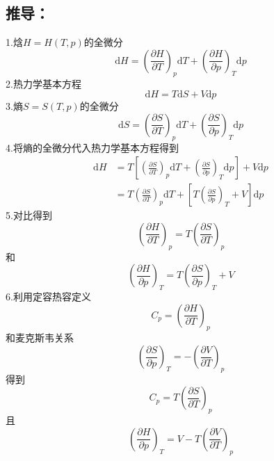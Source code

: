 \newpage
\subsection{推导：}
1.焓$H=H(T,p)$的全微分
\begin{equation}
    \mathrm{d}H=\left( \frac{\partial H}{\partial T} \right) _p\mathrm{d}T+\left( \frac{\partial H}{\partial p} \right) _T\mathrm{d}p
\end{equation}
2.热力学基本方程
\begin{equation}
    \mathrm{d}H=T\mathrm{d}S+V\mathrm{d}p
\end{equation}
3.熵$S=S(T,p)$的全微分
\begin{equation}
    \mathrm{d}S=\left( \frac{\partial S}{\partial T} \right) _p\mathrm{d}T+\left( \frac{\partial S}{\partial p} \right) _T\mathrm{d}p
\end{equation}
4.将熵的全微分代入热力学基本方程得到
\begin{equation}
    \begin{aligned}
        \mathrm{d}H&=T\left[ \left( \frac{\partial S}{\partial T} \right) _p\mathrm{d}T+\left( \frac{\partial S}{\partial p} \right) _T\mathrm{d}p \right] +V\mathrm{d}p
\\
&=T\left( \frac{\partial S}{\partial T} \right) _p\mathrm{d}T+\left[ T\left( \frac{\partial S}{\partial p} \right) _T+V \right] \mathrm{d}p
    \end{aligned}
\end{equation}
5.对比得到
\begin{equation}
    \left( \frac{\partial H}{\partial T} \right) _p=T\left( \frac{\partial S}{\partial T} \right) _p
\end{equation}
和
\begin{equation}
    \left( \frac{\partial H}{\partial p} \right) _T=T\left( \frac{\partial S}{\partial p} \right) _T+V
\end{equation}
6.利用定容热容定义
\begin{equation}
    C_p=\left( \frac{\partial H}{\partial T} \right) _p
\end{equation}
和麦克斯韦关系
\begin{equation}
    \left( \frac{\partial S}{\partial p} \right) _T=-\left( \frac{\partial V}{\partial T} \right) _p
\end{equation}
得到
\begin{equation}
    C_p=T\left( \frac{\partial S}{\partial T} \right) _p
\end{equation}
且
\begin{equation}
    \left( \frac{\partial H}{\partial p} \right) _T=V-T\left( \frac{\partial V}{\partial T} \right) _p
\end{equation}


